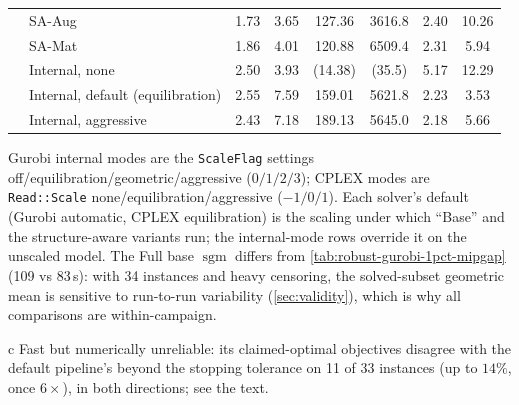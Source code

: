 \documentclass[AMA,Times1COL]{WileyNJDv5} %
\newcommand{\methodAug}{SA-Aug}
\newcommand{\methodMat}{SA-Mat}
\newcommand{\sgm}{\ensuremath{\operatorname{sgm}}}
\providecommand{\DIFadd}[1]{{\protect\color{blue} \sf #1}} %
\providecommand{\DIFaddFL}[1]{\DIFadd{#1}} %
\begin{document}
\begin{table}[t]
\begin{threeparttable}
\begin{tabular}{@{}ll S[table-format=2.2] S[table-format=4.1] S[table-format=3.2] S[table-format=4.1] S[table-format=2.2] S[table-format=4.1] @{}}
 & \methodAug{}                        & 1.73  & 3.65    & 127.36 & 3616.8 & 2.40  & 10.26 \\
 & \methodMat{}                        & 1.86  & 4.01    & 120.88 & 6509.4 & 2.31  & 5.94  \\
 & Internal, none                      & 2.50  & 3.93    & {(14.38)} & {(35.5)} & 5.17  & 12.29 \\
 & Internal, default (equilibration)   & 2.55  & 7.59    & 159.01 & 5621.8 & 2.23  & 3.53  \\
 & Internal, aggressive                & 2.43  & 7.18    & 189.13 & 5645.0 & 2.18  & 5.66  \\
\bottomrule
\end{tabular}
\begin{tablenotes}[flushleft]\footnotesize
\item Gurobi internal modes are the \texttt{ScaleFlag} settings off/equilibration/geometric/aggressive ($0/1/2/3$); CPLEX modes are \texttt{Read::Scale} none/equilibration/aggressive ($-1/0/1$). Each solver's default (Gurobi automatic, CPLEX equilibration) is the scaling under which ``Base'' and the structure-aware variants run; the internal-mode rows override it on the unscaled model. The Full base $\sgm$ differs from \cref{tab:robust-gurobi-1pct-mipgap} (109 vs 83\,s): with 34 instances and heavy censoring, the solved-subset geometric mean is sensitive to run-to-run variability (\cref{sec:validity}), which is why all comparisons are within-campaign.
\item[\DIFaddFL{c}] Fast but numerically unreliable: its claimed-optimal objectives disagree with the default pipeline's beyond the stopping tolerance on 11 of 33 instances (up to $14\%$, once $6\times$), in both directions; see the text.
\end{tablenotes}
\end{threeparttable}
\end{table}
\end{document}
